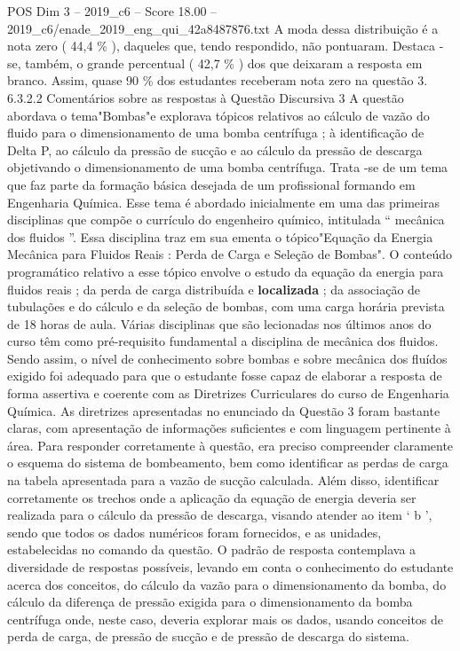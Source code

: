 \begin{textsample}{POS Dim 3 – 2019\_c6 – Score 18.00 – 2019\_c6/enade\_2019\_eng\_qui\_42a8487876.txt}
A moda dessa distribuição é a nota zero ( 44,4 \% ), daqueles que, tendo respondido, não pontuaram.
Destaca -se, também, o grande percentual ( 42,7 \% ) dos que deixaram a resposta em branco.
Assim, quase 90 \% dos estudantes receberam nota zero na questão 3. 6.3.2.2 Comentários sobre as respostas à Questão Discursiva 3 A questão abordava o tema"Bombas"e explorava tópicos relativos ao cálculo de vazão do fluido para o dimensionamento de uma bomba centrífuga ; à identificação de Delta P, ao cálculo da pressão de sucção e ao cálculo da pressão de descarga objetivando o dimensionamento de uma bomba centrífuga.
Trata -se de um tema que faz parte da formação básica desejada de um profissional formando em Engenharia Química.
Esse tema é abordado inicialmente em uma das primeiras disciplinas que compõe o currículo do engenheiro químico, intitulada “ mecânica dos fluidos ”.
Essa disciplina traz em sua ementa o tópico"Equação da Energia Mecânica para Fluidos Reais : Perda de Carga e Seleção de Bombas".
O conteúdo programático relativo a esse tópico envolve o estudo da equação da energia para fluidos reais ; da perda de carga distribuída e \textbf{localizada} ; da associação de tubulações e do cálculo e da seleção de bombas, com uma carga horária prevista de 18 horas de aula.
Várias disciplinas que são lecionadas nos últimos anos do curso têm como pré-requisito fundamental a disciplina de mecânica dos fluidos.
Sendo assim, o nível de conhecimento sobre bombas e sobre mecânica dos fluídos exigido foi adequado para que o estudante fosse capaz de elaborar a resposta de forma assertiva e coerente com as Diretrizes Curriculares do curso de Engenharia Química.
As diretrizes apresentadas no enunciado da Questão 3 foram bastante claras, com apresentação de informações suficientes e com linguagem pertinente à área.
Para responder corretamente à questão, era preciso compreender claramente o esquema do sistema de bombeamento, bem como identificar as perdas de carga na tabela apresentada para a vazão de sucção calculada.
Além disso, identificar corretamente os trechos onde a aplicação da equação de energia deveria ser realizada para o cálculo da pressão de descarga, visando atender ao item ‘ b ’, sendo que todos os dados numéricos foram fornecidos, e as unidades, estabelecidas no comando da questão.
O padrão de resposta contemplava a diversidade de respostas possíveis, levando em conta o conhecimento do estudante acerca dos conceitos, do cálculo da vazão para o dimensionamento da bomba, do cálculo da diferença de pressão exigida para o dimensionamento da bomba centrífuga onde, neste caso, deveria explorar mais os dados, usando conceitos de perda de carga, de pressão de sucção e de pressão de descarga do sistema.

\end{textsample}
